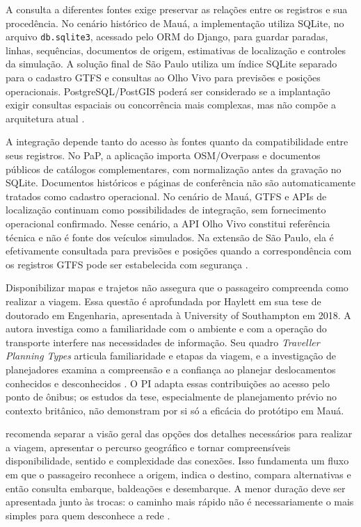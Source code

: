 \documentclass[12pt,oneside,a4paper,brazil,chapter=TITLE]{abntex2}
\begin{document}
A consulta a diferentes fontes exige preservar as relações entre os registros e sua procedência. No cenário histórico de Mauá, a implementação utiliza SQLite, no arquivo \texttt{db.sqlite3}, acessado pelo ORM do Django, para guardar paradas, linhas, sequências, documentos de origem, estimativas de localização e controles da simulação. A solução final de São Paulo utiliza um índice SQLite separado para o cadastro GTFS e consultas ao Olho Vivo para previsões e posições operacionais. PostgreSQL/PostGIS poderá ser considerado se a implantação exigir consultas espaciais ou concorrência mais complexas, mas não compõe a arquitetura atual \citep{postgis}.

A integração depende tanto do acesso às fontes quanto da compatibilidade entre seus registros. No PaP, a aplicação importa OSM/Overpass e documentos públicos de catálogos complementares, com normalização antes da gravação no SQLite. Documentos históricos e páginas de conferência não são automaticamente tratados como cadastro operacional. No cenário de Mauá, GTFS e APIs de localização continuam como possibilidades de integração, sem fornecimento operacional confirmado. Nesse cenário, a API Olho Vivo constitui referência técnica e não é fonte dos veículos simulados. Na extensão de São Paulo, ela é efetivamente consultada para previsões e posições quando a correspondência com os registros GTFS pode ser estabelecida com segurança \citep{sptransapi}.

Disponibilizar mapas e trajetos não assegura que o passageiro compreenda como realizar a viagem. Essa questão é aprofundada por Haylett em sua tese de doutorado em Engenharia, apresentada à University of Southampton em 2018. A autora investiga como a familiaridade com o ambiente e com a operação do transporte interfere nas necessidades de informação. Seu quadro \textit{Traveller Planning Types} articula familiaridade e etapas da viagem, e a investigação de planejadores examina a compreensão e a confiança ao planejar deslocamentos conhecidos e desconhecidos \citep{haylett2018}. O PI adapta essas contribuições ao acesso pelo ponto de ônibus; os estudos da tese, especialmente de planejamento prévio no contexto britânico, não demonstram por si só a eficácia do protótipo em Mauá.

\citet[p.~138--144]{haylett2018} recomenda separar a visão geral das opções dos detalhes necessários para realizar a viagem, apresentar o percurso geográfico e tornar compreensíveis disponibilidade, sentido e complexidade das conexões. Isso fundamenta um fluxo em que o passageiro reconhece a origem, indica o destino, compara alternativas e então consulta embarque, baldeações e desembarque. A menor duração deve ser apresentada junto às trocas: o caminho mais rápido não é necessariamente o mais simples para quem desconhece a rede \citep{haylett2018}.
\end{document}
